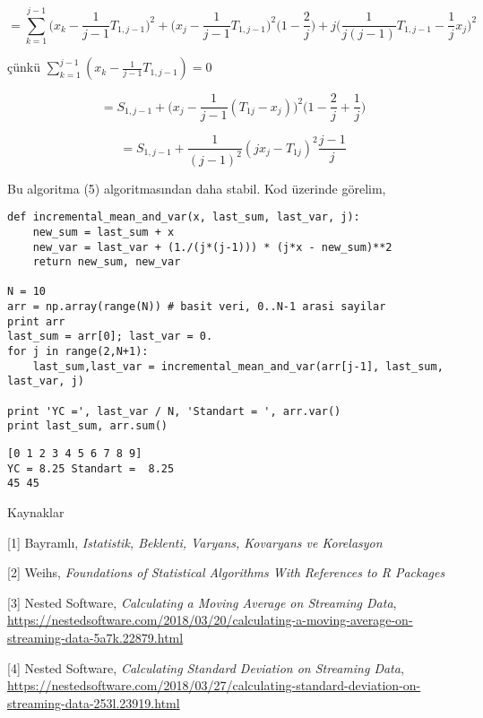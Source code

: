 \documentclass[12pt,fleqn]{article}\usepackage{../../common}
\begin{document}
$$ 
= \sum _{k=1}^{j-1} \bigg( x_k - \frac{1}{j-1} T_{1,j-1} \bigg)^2 + 
\bigg( x_j - \frac{1}{j-1} T_{1,j-1} \bigg)^2 \bigg( 1-\frac{2}{j} \bigg) + 
j \bigg( \frac{1}{j(j-1)} T_{1,j-1} - \frac{1}{j}x_j \bigg)^2
$$

çünkü $\sum _{k=1}^{j-1} (x_k-\frac{1}{j-1} T_{1,j-1} )=0$

$$ 
= S_{1,j-1}  + \bigg( x_j - \frac{1}{j-1} (T_{1j}-x_j) \bigg) ^2
\bigg( 1-\frac{2}{j}+\frac{1}{j}\bigg)
$$

$$ = S_{1,j-1} + \frac{1}{(j-1)^2} (jx_j - T_{1j})^2 \frac{j-1}{j} $$

Bu algoritma (5) algoritmasından daha stabil. Kod üzerinde görelim,

\begin{verbatim}
def incremental_mean_and_var(x, last_sum, last_var, j):
    new_sum = last_sum + x
    new_var = last_var + (1./(j*(j-1))) * (j*x - new_sum)**2 
    return new_sum, new_var

N = 10
arr = np.array(range(N)) # basit veri, 0..N-1 arasi sayilar
print arr
last_sum = arr[0]; last_var = 0.
for j in range(2,N+1):
    last_sum,last_var = incremental_mean_and_var(arr[j-1], last_sum, last_var, j)

print 'YC =', last_var / N, 'Standart = ', arr.var()
print last_sum, arr.sum()
\end{verbatim}

\begin{verbatim}
[0 1 2 3 4 5 6 7 8 9]
YC = 8.25 Standart =  8.25
45 45
\end{verbatim}


Kaynaklar

[1] Bayramlı, {\em Istatistik, Beklenti, Varyans, Kovaryans ve Korelasyon}

[2] Weihs, {\em Foundations of Statistical Algorithms With References to R Packages}

[3] Nested Software, {\em Calculating a Moving Average on Streaming Data},
    \url{https://nestedsoftware.com/2018/03/20/calculating-a-moving-average-on-streaming-data-5a7k.22879.html}

[4] Nested Software, {\em Calculating Standard Deviation on Streaming Data},
    \url{https://nestedsoftware.com/2018/03/27/calculating-standard-deviation-on-streaming-data-253l.23919.html}
\end{document}
